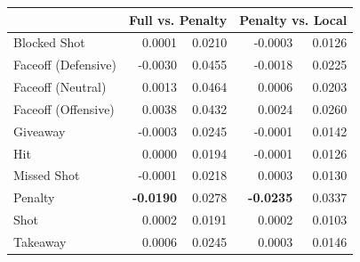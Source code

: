 \documentclass[]{article}
\begin{document}
\begin{table}[htb]
\begin{center}
{\begin{tabular}{|l|r|r|r|r|}
& \multicolumn{2}{|c|}{\bf{Full vs. Penalty}} & \multicolumn{2}{|c|}{\bf{Penalty vs. Local}} \\ \hline
Blocked Shot & 0.0001 & 0.0210 & -0.0003 & 0.0126 \\ \hline
Faceoff (Defensive) & -0.0030 & 0.0455 & -0.0018 & 0.0225 \\ \hline
Faceoff (Neutral) & 0.0013 & 0.0464 & 0.0006 & 0.0203 \\ \hline
Faceoff (Offensive) & 0.0038 & 0.0432 & 0.0024 & 0.0260 \\ \hline
Giveaway & -0.0003 & 0.0245 & -0.0001 & 0.0142 \\ \hline
Hit & 0.0000 & 0.0194 & -0.0001 & 0.0126 \\ \hline
Missed Shot & -0.0001 & 0.0218 & 0.0003 & 0.0130 \\ \hline
Penalty & \bf{-0.0190} & 0.0278 & \bf{-0.0235} & 0.0337 \\ \hline
Shot & 0.0002 & 0.0191 & 0.0002 & 0.0103 \\ \hline
Takeaway & 0.0006 & 0.0245 & 0.0003 & 0.0146 \\ \hline
\end{tabular}
}
\end{center}
\end{table}
\end{document}
